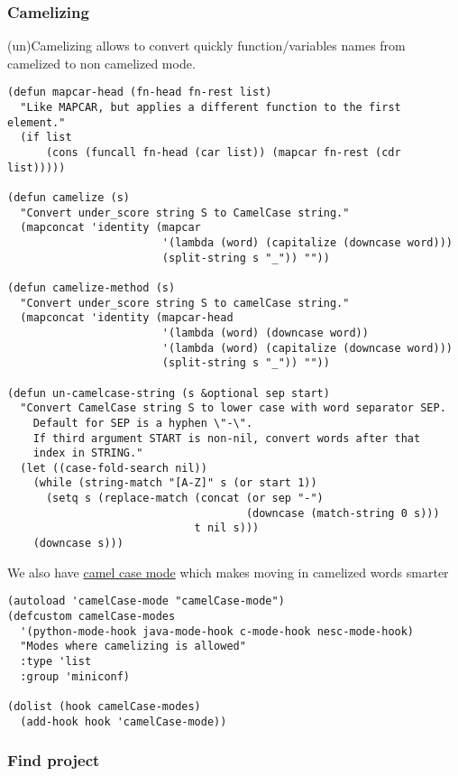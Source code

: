 \documentclass[11pt]{article}
\begin{document}
\subsubsection{Camelizing}
\label{sec-18.2.12}

    (un)Camelizing allows to convert quickly function/variables names from camelized to non camelized mode.

\begin{verbatim}
(defun mapcar-head (fn-head fn-rest list)
  "Like MAPCAR, but applies a different function to the first element."
  (if list
      (cons (funcall fn-head (car list)) (mapcar fn-rest (cdr list)))))

(defun camelize (s)
  "Convert under_score string S to CamelCase string."
  (mapconcat 'identity (mapcar
                        '(lambda (word) (capitalize (downcase word)))
                        (split-string s "_")) ""))

(defun camelize-method (s)
  "Convert under_score string S to camelCase string."
  (mapconcat 'identity (mapcar-head
                        '(lambda (word) (downcase word))
                        '(lambda (word) (capitalize (downcase word)))
                        (split-string s "_")) ""))

(defun un-camelcase-string (s &optional sep start)
  "Convert CamelCase string S to lower case with word separator SEP.
    Default for SEP is a hyphen \"-\".
    If third argument START is non-nil, convert words after that
    index in STRING."
  (let ((case-fold-search nil))
    (while (string-match "[A-Z]" s (or start 1))
      (setq s (replace-match (concat (or sep "-") 
                                     (downcase (match-string 0 s))) 
                             t nil s)))
    (downcase s)))
\end{verbatim}


      We also have \href{http://www.eecs.ucf.edu/~leavens/emacs/camelCase/camelCase-mode.html}{camel case mode} which makes moving in camelized words smarter
\begin{verbatim}
(autoload 'camelCase-mode "camelCase-mode")
(defcustom camelCase-modes
  '(python-mode-hook java-mode-hook c-mode-hook nesc-mode-hook)
  "Modes where camelizing is allowed"
  :type 'list
  :group 'miniconf)

(dolist (hook camelCase-modes)
  (add-hook hook 'camelCase-mode))
\end{verbatim}
\subsubsection{Find project}
\label{sec-18.2.13}
\end{document}
